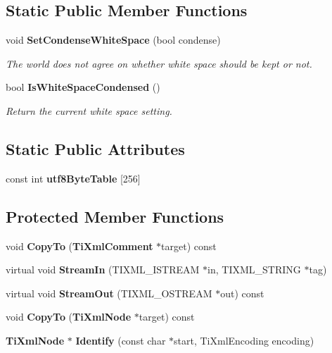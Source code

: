 \subsection*{Static Public Member Functions}
\begin{CompactItemize}
\item 
void {\bf Set\-Condense\-White\-Space} (bool condense)
\begin{CompactList}\small\item\em The world does not agree on whether white space should be kept or not. \item\end{CompactList}\item 
bool {\bf Is\-White\-Space\-Condensed} ()\label{classTiXmlBase_TiXmlUnknowne1}

\begin{CompactList}\small\item\em Return the current white space setting. \item\end{CompactList}\end{CompactItemize}
\subsection*{Static Public Attributes}
\begin{CompactItemize}
\item 
const int {\bf utf8Byte\-Table} [256]
\end{CompactItemize}
\subsection*{Protected Member Functions}
\begin{CompactItemize}
\item 
void {\bf Copy\-To} ({\bf Ti\-Xml\-Comment} $\ast$target) const\label{classTiXmlComment_TiXmlCommentb0}

\item 
virtual void {\bf Stream\-In} (TIXML\_\-ISTREAM $\ast$in, TIXML\_\-STRING $\ast$tag)\label{classTiXmlComment_TiXmlCommentb1}

\item 
virtual void {\bf Stream\-Out} (TIXML\_\-OSTREAM $\ast$out) const\label{classTiXmlComment_TiXmlCommentb2}

\item 
void {\bf Copy\-To} ({\bf Ti\-Xml\-Node} $\ast$target) const\label{classTiXmlNode_TiXmlUnknownb3}

\item 
{\bf Ti\-Xml\-Node} $\ast$ {\bf Identify} (const char $\ast$start, Ti\-Xml\-Encoding encoding)\label{classTiXmlNode_TiXmlUnknownb4}

\end{CompactItemize}
